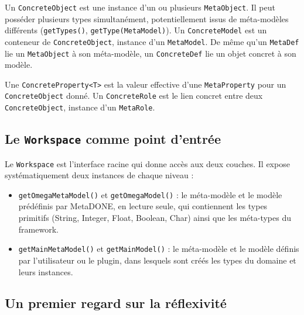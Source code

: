 Un \texttt{ConcreteObject} est une instance d'un ou plusieurs \texttt{MetaObject}. Il peut posséder plusieurs types simultanément, potentiellement issus de méta-modèles différents (\texttt{getTypes()}, \texttt{getType(MetaModel)}). Un \texttt{ConcreteModel} est un conteneur de \texttt{ConcreteObject}, instance d'un \texttt{MetaModel}. De même qu'un \texttt{MetaDef} lie un \texttt{MetaObject} à son méta-modèle, un \texttt{ConcreteDef} lie un objet concret à son modèle.

Une \texttt{ConcreteProperty<T>} est la valeur effective d'une \texttt{MetaProperty} pour un \texttt{ConcreteObject} donné. Un \texttt{ConcreteRole} est le lien concret entre deux \texttt{ConcreteObject}, instance d'un \texttt{MetaRole}.

\subsection{Le \texttt{Workspace} comme point d'entrée}
\label{sec:workspace}

Le \texttt{Workspace} est l'interface racine qui donne accès aux deux couches. Il expose systématiquement deux instances de chaque niveau :

\begin{itemize}
    \item \texttt{getOmegaMetaModel()} et \texttt{getOmegaModel()} : le méta-modèle et le modèle prédéfinis par MetaDONE, en lecture seule, qui contiennent les types primitifs (String, Integer, Float, Boolean, Char) ainsi que les méta-types du framework.
    
    \item \texttt{getMainMetaModel()} et \texttt{getMainModel()} : le méta-modèle et le modèle définis par l'utilisateur ou le plugin, dans lesquels sont créés les types du domaine et leurs instances.
\end{itemize}

\subsection{Un premier regard sur la réflexivité}
\label{sec:reflexivite-intro}

